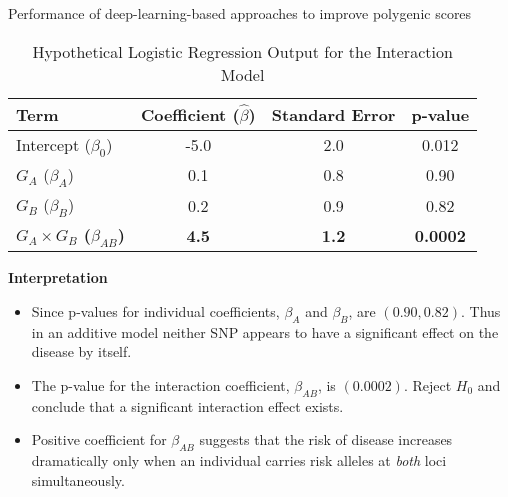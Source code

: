 \documentclass[twocolumn]{article}
\begin{document}
\begin{literaturepaper}{Performance of deep-learning-based approaches to improve polygenic scores \cite{Kelemen2025PolygenicScores}}
\begin{table}[h!]
\centering
\caption{Hypothetical Logistic Regression Output for the Interaction Model}
\begin{tabular}{lccc}
\toprule
\textbf{Term} & \textbf{Coefficient ($\hat{\beta}$)} & \textbf{Standard Error} & \textbf{p-value} \\
\midrule
Intercept ($\beta_0$) & -5.0 & 2.0 & 0.012 \\
$G_A$ ($\beta_A$) & 0.1 & 0.8 & 0.90 \\
$G_B$ ($\beta_B$) & 0.2 & 0.9 & 0.82 \\
\textbf{$G_A \times G_B$ ($\beta_{AB}$)} & \textbf{4.5} & \textbf{1.2} & \textbf{0.0002} \\
\bottomrule
\end{tabular}
\end{table}

\textbf{Interpretation}
\begin{itemize}
    \item Since p-values for individual coefficients, $\beta_A$ and $\beta_B$, are $(0.90, 0.82)$. Thus in an additive model neither SNP appears to have a significant effect on the disease by itself.
    \item The p-value for the interaction coefficient, $\beta_{AB}$, is $(0.0002)$. Reject $H_0$ and conclude that a significant interaction effect exists.
    \item Positive coefficient for $\beta_{AB}$ suggests that the risk of disease increases dramatically only when an individual carries risk alleles at \textit{both} loci simultaneously.
\end{itemize}


\end{literaturepaper}
\end{document}
